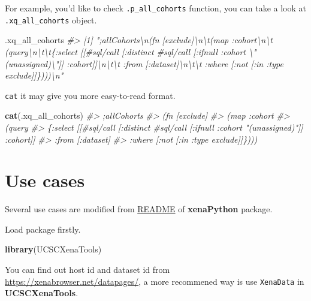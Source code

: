 \documentclass[nofonts,]{tufte-handout}
\newenvironment{Shaded}{\begin{snugshade}}{\end{snugshade}}
\newcommand{\CommentTok}[1]{\textcolor[rgb]{0.56,0.35,0.01}{\textit{#1}}}
\newcommand{\KeywordTok}[1]{\textcolor[rgb]{0.13,0.29,0.53}{\textbf{#1}}}
\newcommand{\NormalTok}[1]{#1}
\begin{document}
For example, you'd like to check \texttt{.p\_all\_cohorts} function, you
can take a look at \texttt{.xq\_all\_cohorts} object.

\begin{Shaded}
\begin{Highlighting}[]
\NormalTok{.xq_all_cohorts}
\CommentTok{#> [1] ";allCohorts\textbackslash{}n(fn [exclude]\textbackslash{}n\textbackslash{}t(map :cohort\textbackslash{}n\textbackslash{}t  (query\textbackslash{}n\textbackslash{}t\textbackslash{}t\{:select [[#sql/call [:distinct #sql/call [:ifnull :cohort \textbackslash{}"(unassigned)\textbackslash{}"]] :cohort]]\textbackslash{}n\textbackslash{}t\textbackslash{}t :from [:dataset]\textbackslash{}n\textbackslash{}t\textbackslash{}t :where [:not [:in :type exclude]]\})))\textbackslash{}n"}
\end{Highlighting}
\end{Shaded}

\texttt{cat} it may give you more easy-to-read format.

\begin{Shaded}
\begin{Highlighting}[]
\KeywordTok{cat}\NormalTok{(.xq_all_cohorts)}
\CommentTok{#> ;allCohorts}
\CommentTok{#> (fn [exclude]}
\CommentTok{#>  (map :cohort}
\CommentTok{#>    (query}
\CommentTok{#>      \{:select [[#sql/call [:distinct #sql/call [:ifnull :cohort "(unassigned)"]] :cohort]]}
\CommentTok{#>       :from [:dataset]}
\CommentTok{#>       :where [:not [:in :type exclude]]\})))}
\end{Highlighting}
\end{Shaded}

\hypertarget{use-cases}{%
\section{Use cases}\label{use-cases}}

Several use cases are modified from
\href{https://github.com/ucscXena/xenaPython}{README} of
\textbf{xenaPython} package.

Load package firstly.

\begin{Shaded}
\begin{Highlighting}[]
\KeywordTok{library}\NormalTok{(UCSCXenaTools)}
\end{Highlighting}
\end{Shaded}

You can find out host id and dataset id from
\url{https://xenabrowser.net/datapages/}, a more recommened way is use
\texttt{XenaData} in \textbf{UCSCXenaTools}.
\end{document}
